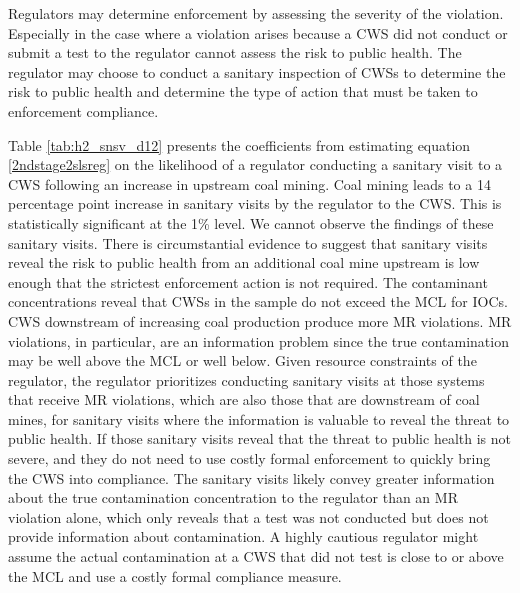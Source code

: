 \documentclass{article}
\begin{document}
Regulators may determine enforcement by assessing the severity of the violation. Especially in the case where a violation arises because a CWS did not conduct or submit a test to the regulator cannot assess the risk to public health. The regulator may choose to conduct a sanitary inspection of CWSs to determine the risk to public health and determine the type of action that must be taken to enforcement compliance.

Table \ref{tab:h2_snsv_d12} presents the coefficients from estimating equation \ref{2ndstage2slsreg} on the likelihood of a regulator conducting a sanitary visit to a CWS following an increase in upstream coal mining. Coal mining leads to a 14 percentage point increase in sanitary visits by the regulator to the CWS. This is statistically significant at the 1\% level. We cannot observe the findings of these sanitary visits. There is circumstantial evidence to suggest that sanitary visits reveal the risk to public health from an additional coal mine upstream is low enough that the strictest enforcement action is not required. The contaminant concentrations reveal that CWSs in the sample do not exceed the MCL for IOCs. CWS downstream of increasing coal production produce more MR violations. MR violations, in particular, are an information problem since the true contamination may be well above the MCL or well below. Given resource constraints of the regulator, the regulator prioritizes conducting sanitary visits at those systems that receive MR violations, which are also those that are downstream of coal mines, for sanitary visits where the information is valuable to reveal the threat to public health. If those sanitary visits reveal that the threat to public health is not severe, and they do not need to use costly formal enforcement to quickly bring the CWS into compliance. The sanitary visits likely convey greater information about the true contamination concentration to the regulator than an MR violation alone, which only reveals that a test was not conducted but does not provide information about contamination. A highly cautious regulator might assume the actual contamination at a CWS that did not test is close to or above the MCL and use a costly formal compliance measure.










\end{document}
